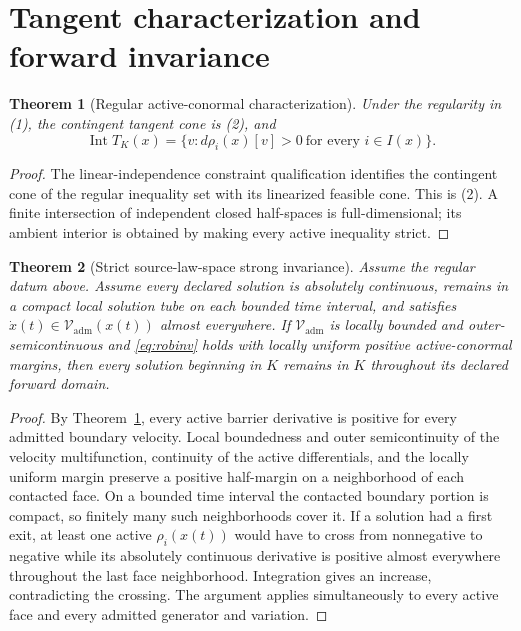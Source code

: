 \documentclass[11pt]{article}
\newtheorem{theorem}{Theorem}
\newcommand{\Vad}{\mathcal V_{\mathrm{adm}}}
\begin{document}
\section{Tangent characterization and forward invariance}

\begin{theorem}[Regular active-conormal characterization]
\label{thm:tangent}
Under the regularity in (1), the contingent tangent cone is (2), and
\[
 \operatorname{Int}T_K(x)
 =\{v:d\rho_i(x)[v]>0\ \text{for every }i\in I(x)\}.
\]
\end{theorem}

\begin{proof}
The linear-independence constraint qualification identifies the contingent
cone of the regular inequality set with its linearized feasible cone.  This
is (2).  A finite intersection of independent closed half-spaces is
full-dimensional; its ambient interior is obtained by making every active
inequality strict.
\end{proof}

\begin{theorem}[Strict source-law-space strong invariance]
\label{thm:invariance}
Assume the regular datum above.  Assume every declared solution is absolutely
continuous, remains in a compact local solution tube on each bounded time
interval, and satisfies
\(\dot x(t)\in\Vad(x(t))\) almost everywhere.  If \(\Vad\) is locally bounded
and outer-semicontinuous and \eqref{eq:robinv} holds with locally uniform
positive active-conormal margins,
then every solution beginning in \(K\) remains in \(K\) throughout its
declared forward domain.
\end{theorem}

\begin{proof}
By Theorem~\ref{thm:tangent}, every active barrier derivative is positive for
every admitted boundary velocity.  Local boundedness and outer
semicontinuity of the velocity multifunction, continuity of the active
differentials, and the locally uniform margin preserve a positive half-margin
on a neighborhood of each contacted face.  On a bounded time interval the
contacted boundary portion is compact, so finitely many such neighborhoods
cover it.  If a solution had a first exit, at least one active
\(\rho_i(x(t))\) would have to cross from nonnegative to negative while its
absolutely continuous derivative is positive almost everywhere throughout
the last face neighborhood.  Integration gives an increase, contradicting
the crossing.  The argument applies simultaneously to every active face and
every admitted generator and variation.
\end{proof}
\end{document}
